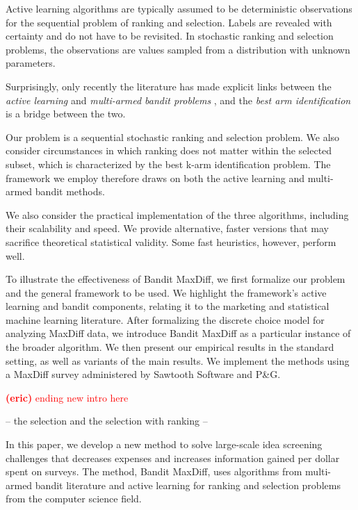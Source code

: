 \documentclass[nonblindrev]{informs3}
\newcommand{\eric}[1]{\textcolor{red}{\textbf{(eric)} #1}}
\begin{document}
Active learning algorithms are typically assumed to be deterministic observations for the sequential problem of ranking and selection. Labels are revealed with certainty and do not have to be revisited. In stochastic ranking and selection problems, the observations are values sampled from a distribution with unknown parameters.

Surprisingly, only recently the literature has made explicit links between the \emph{active learning} and \emph{multi-armed bandit problems} \citep{gantigray2013bridgealmab}, and the \emph{best arm identification} is a bridge between the two.



Our problem is a sequential stochastic ranking and selection problem. We also consider circumstances in which ranking does not matter within the selected subset, which is characterized by the best k-arm identification problem. The framework we employ therefore draws on both the active learning and multi-armed bandit methods.

We also consider the practical implementation of the three algorithms, including their scalability and speed. We provide alternative, faster versions that may sacrifice theoretical statistical validity. Some fast heuristics, however, perform well.



To illustrate the effectiveness of Bandit MaxDiff, we first formalize our problem and the general framework to be used. We highlight the framework's active learning and bandit components, relating it to the marketing and statistical machine learning literature. After formalizing the discrete choice model for analyzing MaxDiff data, we introduce Bandit MaxDiff as a particular instance of the broader algorithm. We then present our empirical results in the standard setting, as well as variants of the main results. We implement the methods using a MaxDiff survey administered by Sawtooth Software and P\&G. 



\eric{ending new intro here}

 -- the selection and the selection with ranking -- 

In this paper, we develop a new method to solve large-scale idea screening challenges that decreases expenses and increases information gained per dollar spent on surveys. The method, Bandit MaxDiff, uses algorithms from multi-armed bandit literature and active learning for ranking and selection problems from the computer science field. 
\end{document}
